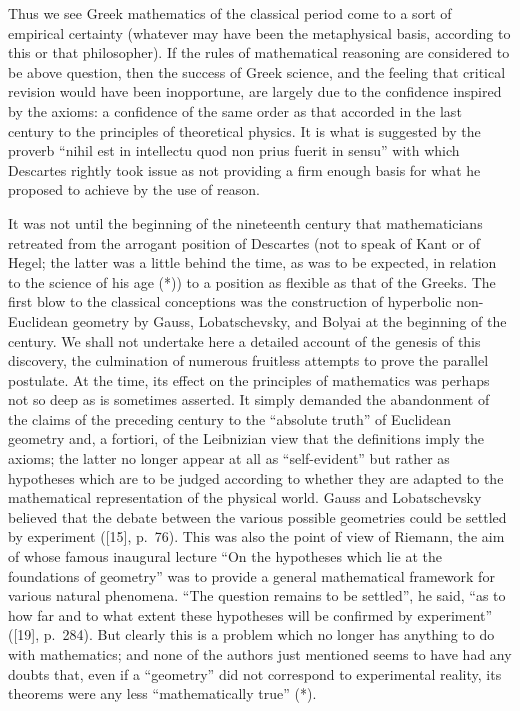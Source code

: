 Thus we see Greek mathematics of the classical period come to a sort of empirical certainty (whatever may have been the metaphysical basis, according to this or that philosopher). If the rules of mathematical reasoning are considered to be above question, then the success of Greek science, and the feeling that critical revision would have been inopportune, are largely due to the confidence inspired by the axioms: a confidence of the same order as that accorded in the last century to the principles of theoretical physics. It is what is suggested by the proverb ``nihil est in intellectu quod non prius fuerit in sensu'' with which Descartes rightly took issue as not providing a firm enough basis for what he proposed to achieve by the use of reason.

It was not until the beginning of the nineteenth century that mathematicians retreated from the arrogant position of Descartes (not to speak of Kant or of Hegel; the latter was a little behind the time, as was to be expected, in relation to the science of his age (*)) to a position as flexible as that of the Greeks. The first blow to the classical conceptions was the construction of hyperbolic non-Euclidean geometry by Gauss, Lobatschevsky, and Bolyai at the beginning of the century. We shall not undertake here a detailed account of the genesis of this discovery, the culmination of numerous fruitless attempts to prove the parallel postulate. At the time, its effect on the principles of mathematics was perhaps not so deep as is sometimes asserted. It simply demanded the abandonment of the claims of the preceding century to the ``absolute truth'' of Euclidean geometry and, a fortiori, of the Leibnizian view that the definitions imply the axioms; the latter no longer appear at all as ``self-evident'' but rather as hypotheses which are to be judged according to whether they are adapted to the mathematical representation of the physical world. Gauss and Lobatschevsky believed that the debate between the various possible geometries could be settled by experiment ({[}15{]}, p.~76). This was also the point of view of Riemann, the aim of whose famous inaugural lecture ``On the hypotheses which lie at the foundations of geometry'' was to provide a general mathematical framework for various natural phenomena. ``The question remains to be settled'', he said, ``as to how far and to what extent these hypotheses will be confirmed by experiment'' ({[}19{]}, p.~284). But clearly this is a problem which no longer has anything to do with mathematics; and none of the authors just mentioned seems to have had any doubts that, even if a ``geometry'' did not correspond to experimental reality, its theorems were any less ``mathematically true'' (*).

